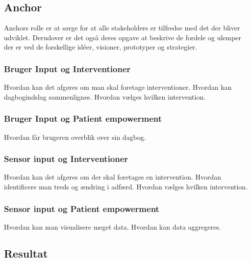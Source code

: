 \subsection{Anchor}
Anchors rolle er at sørge for at alle stakeholders er tilfredse med det der bliver udviklet.
Derudover er det også deres opgave at beskrive de fordele og ulemper der er ved de forskellige idéer, visioner, prototyper og strategier.

\subsubsection*{Bruger Input og Interventioner}
Hvordan kan det afgøres om man skal foretage interventioner.
Hvordan kan dagbogindslag sammenlignes.
Hvordan vælges hvilken intervention.
\subsubsection*{Bruger Input og Patient empowerment}
Hvordan får brugeren overblik over sin dagbog.
\subsubsection*{Sensor input og Interventioner} 
Hvordan kan det afgøres om der skal foretages en intervention.
Hvordan identificere man treds og ændring i adfærd.
Hvordan vælges hvilken intervention.
\subsubsection*{Sensor input og Patient empowerment}
Hvordan kan man visualisere meget data.
Hvordan kan data aggregeres.

\subsection{Resultat}






